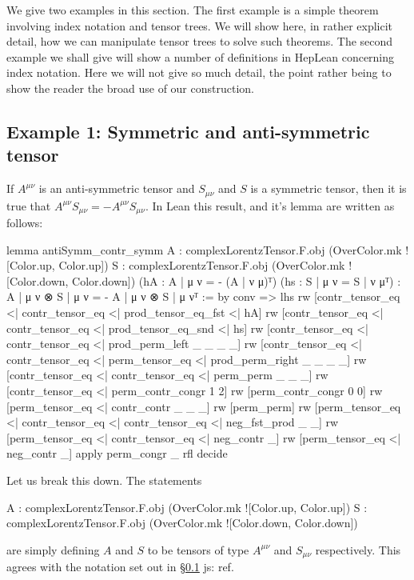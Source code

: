 \documentclass[a4paper, 11pt]{article}
\newcommand{\js}[1]{ {\color{magenta} js:  #1}}
\begin{document}
We give two examples in this section. The first example is a simple theorem involving index notation and 
tensor trees. We will show here, in rather explicit detail, how we can manipulate tensor trees to solve 
such theorems. 
The second example we shall give will show a number of definitions in HepLean concerning index notation.
Here we will not give so much detail, the point rather being to show the reader the broad use of our 
construction. 

\subsection{Example 1: Symmetric and anti-symmetric tensor}
If $A^{\mu \nu}$ is an anti-symmetric tensor and $S_{\mu \nu}$ and $S$ is a symmetric tensor, then
it is true that $A^{\mu \nu} S_{\mu \nu} = - A^{\mu \nu} S_{\mu \nu}$. In Lean this result, and 
it's lemma are written as follows: 
\begin{code}
lemma antiSymm_contr_symm 
    {A : complexLorentzTensor.F.obj (OverColor.mk ![Color.up, Color.up])}
    {S : complexLorentzTensor.F.obj (OverColor.mk ![Color.down, Color.down])}
    (hA : {A | μ ν = - (A | ν μ)}ᵀ) (hs : {S | μ ν = S | ν μ}ᵀ) :
    {A | μ ν ⊗ S | μ ν = - A | μ ν ⊗ S | μ ν}ᵀ := by
  conv =>
    lhs
    rw [contr_tensor_eq <| contr_tensor_eq <| prod_tensor_eq_fst <| hA]
    rw [contr_tensor_eq <| contr_tensor_eq <| prod_tensor_eq_snd <| hs]
    rw [contr_tensor_eq <| contr_tensor_eq <| prod_perm_left _ _ _ _]
    rw [contr_tensor_eq <| contr_tensor_eq <| perm_tensor_eq <| prod_perm_right _ _ _ _]
    rw [contr_tensor_eq <| contr_tensor_eq <| perm_perm _ _ _]
    rw [contr_tensor_eq <| perm_contr_congr 1 2]
    rw [perm_contr_congr 0 0]
    rw [perm_tensor_eq <| contr_contr _ _ _]
    rw [perm_perm]
    rw [perm_tensor_eq <| contr_tensor_eq <| contr_tensor_eq <| neg_fst_prod _ _]
    rw [perm_tensor_eq <| contr_tensor_eq <| neg_contr _]
    rw [perm_tensor_eq <| neg_contr _]
  apply perm_congr _ rfl
  decide
\end{code}
Let us break this down. The statements 
\begin{code} 
{A : complexLorentzTensor.F.obj (OverColor.mk ![Color.up, Color.up])}
{S : complexLorentzTensor.F.obj (OverColor.mk ![Color.down, Color.down])}
\end{code}
are simply defining $A$ and $S$ to be tensors of type $A^{\mu \nu}$ and $S_{\mu \nu}$ respectively.
This agrees with the notation set out in \S\ref{} \js{ref}.
\end{document}
